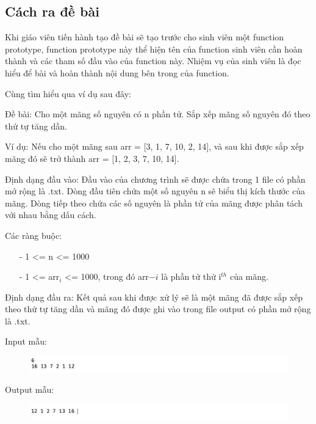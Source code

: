 \documentclass[12pt,a4paper]{article}
\begin{document}
\subsection{Cách ra đề bài}
Khi giáo viên tiến hành tạo đề bài sẽ tạo trước cho sinh viên một function prototype, function prototype này thể hiện tên của function sinh viên cần hoàn thành và các tham số đầu vào của function này. Nhiệm vụ của sinh viên là đọc hiểu để bài và hoàn thành nội dung bên trong của function.

Cùng tìm hiểu qua ví dụ sau đây:

Đề bài: Cho một mãng số nguyên có n phần tử. Sắp xếp mãng số nguyên đó theo thứ tự tăng dần.

Ví dụ: Nếu cho một mãng sau arr = [3, 1, 7, 10, 2, 14], và sau khi được sắp xếp mãng đó sẽ trở thành arr = [1, 2, 3, 7, 10, 14].

Định dạng đầu vào: Đầu vào của chương trình sẽ được chứa trong 1 file có phần mở rộng là .txt. Dòng đầu tiên chứa một số nguyên n sẽ biểu thị kích thước của mãng. Dòng tiếp theo chứa các số nguyên là phần tử của mãng được phân tách với nhau bằng dấu cách.

Các ràng buộc:

\begin{itemize}
\item[-] 1 <= n <= 1000
\item[-] 1 <= arr$_{i}$  <= 1000, trong đó arr$-{i}$ là phần tử thứ i$^{th}$ của mãng.
\end{itemize}

Định dạng đầu ra: Kết quả sau khi được xử lý sẽ là một mãng đã được sắp xếp theo thứ tự tăng dần và mãng đó được ghi vào trong file output có phần mở rộng là .txt.

Input mẫu:

\begin{figure}[ht]
\begin{center}
\includegraphics[scale=.3]{hinhanh/inputsample.png}
\end{center}
\end{figure}

Output mẫu:

\begin{figure}[ht]
\begin{center}
\includegraphics[scale=.3]{hinhanh/outputsample.png}
\end{center}
\end{figure}
\end{document}
